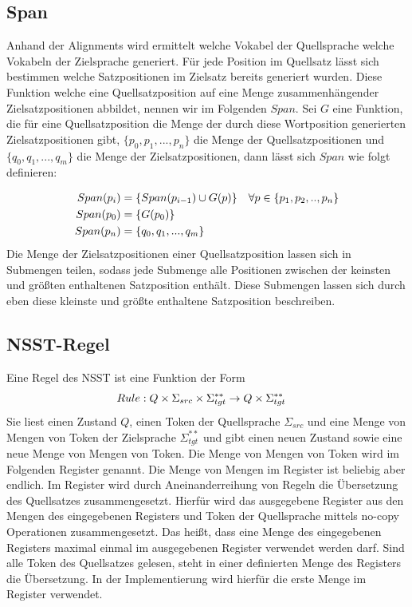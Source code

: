 \documentclass[conference]{IEEEtran}
\begin{document}
\subsection{Span}
Anhand der Alignments wird ermittelt welche Vokabel der Quellsprache welche 
Vokabeln der Zielsprache generiert. 
Für jede Position im Quellsatz lässt sich bestimmen welche Satzpositionen im Zielsatz bereits generiert wurden. 
Diese Funktion welche eine Quellsatzposition auf eine Menge zusammenhängender Zielsatzpositionen abbildet, nennen wir im Folgenden $Span$.
Sei $G$ eine Funktion, die für eine Quellsatzposition die Menge der durch diese Wortposition generierten Zielsatzpositionen gibt, $\{p_0, p_1,..., p_n\}$ die Menge der Quellsatzpositionen und $\{q_0, q_1,..., q_m\}$ die Menge der Zielsatzpositionen, dann lässt sich  $Span$ wie folgt definieren:

\begin{equation}\notag
    \begin{aligned}
        Span(p_i) &= \{Span(p_{i-1}) \cup G(p)\} && \forall p \in \{p_1, p_2, .. , p_n\}\\
        Span(p_0) &= \{G(p_0)\}\\
        Span(p_n) &= \{q_0, q_1, ... , q_m\}
    \end{aligned}
\end{equation}
Die Menge der Zielsatzpositionen einer Quellsatzposition lassen sich in Submengen teilen, sodass jede Submenge alle Positionen zwischen der keinsten und größten enthaltenen Satzposition enthält. Diese Submengen lassen sich durch eben diese kleinste und größte enthaltene Satzposition beschreiben.

\subsection{NSST-Regel}
Eine Regel des NSST ist eine Funktion der Form 
\begin{equation}\notag
    \begin{aligned}
        Rule: Q \times \Sigma_{src} &\times \Sigma_{tgt}^{**} \rightarrow Q \times \Sigma_{tgt}^{**}
    \end{aligned}
\end{equation}
Sie liest einen Zustand $Q$, einen Token der Quellsprache $\Sigma_{src}$ und eine Menge von Mengen von Token der Zielsprache $\Sigma_{tgt}^{**}$ und gibt einen neuen Zustand sowie eine neue Menge von Mengen von Token.
Die Menge von Mengen von Token wird im Folgenden Register genannt.
Die Menge von Mengen im Register ist beliebig aber endlich.
Im Register wird durch Aneinanderreihung von Regeln die Übersetzung des Quellsatzes zusammengesetzt.
Hierfür wird das ausgegebene Register aus den Mengen des eingegebenen Registers und Token der Quellsprache mittels no-copy Operationen zusammengesetzt.
Das heißt, dass eine Menge des eingegebenen Registers maximal einmal im ausgegebenen Register verwendet werden darf.
Sind alle Token des Quellsatzes gelesen, steht in einer definierten Menge des Registers die Übersetzung.
In der Implementierung wird hierfür die erste Menge im Register verwendet.
\end{document}
